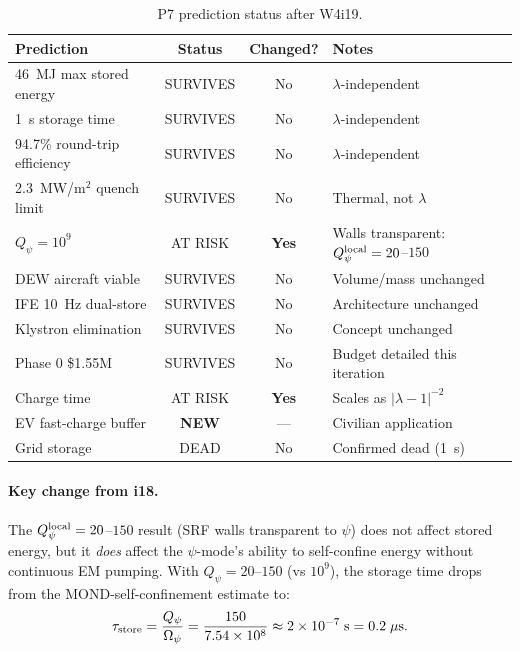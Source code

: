 \documentclass[11pt]{article}
\newcommand{\ee}[1]{\times 10^{#1}}
\newcommand{\lambdaone}{|\lambda-1|}
\newcommand{\Opsi}{\Omega_\psi}
\begin{document}
\begin{table}[h]
\centering
\caption{P7 prediction status after W4i19.}
\label{tab:status}
\begin{tabular}{@{}lccl@{}}
\toprule
\textbf{Prediction} & \textbf{Status} & \textbf{Changed?} & \textbf{Notes} \\
\midrule
46~MJ max stored energy & SURVIVES & No & $\lambda$-independent \\
1~s storage time & SURVIVES & No & $\lambda$-independent \\
94.7\% round-trip efficiency & SURVIVES & No & $\lambda$-independent \\
2.3~MW/m$^2$ quench limit & SURVIVES & No & Thermal, not $\lambda$ \\
$Q_\psi = 10^9$ & AT RISK & \textbf{Yes} & Walls transparent: $Q_\psi^{\rm local} = 20$--$150$ \\
DEW aircraft viable & SURVIVES & No & Volume/mass unchanged \\
IFE 10~Hz dual-store & SURVIVES & No & Architecture unchanged \\
Klystron elimination & SURVIVES & No & Concept unchanged \\
Phase 0 \$1.55M & SURVIVES & No & Budget detailed this iteration \\
Charge time & AT RISK & \textbf{Yes} & Scales as $\lambdaone^{-2}$ \\
EV fast-charge buffer & \textbf{NEW} & --- & Civilian application \\
Grid storage & DEAD & No & Confirmed dead (1~s) \\
\bottomrule
\end{tabular}
\end{table}

\paragraph{Key change from i18.}
The $Q_\psi^{\rm local} = 20$--$150$ result (SRF walls transparent to
$\psi$) does not affect stored energy, but it \emph{does} affect the
$\psi$-mode's ability to self-confine energy without continuous EM pumping.
With $Q_\psi = 20$--$150$ (vs $10^9$), the storage time drops from the
MOND-self-confinement estimate to:
\begin{equation}
\tau_{\rm store} = \frac{Q_\psi}{\Opsi}
= \frac{150}{7.54\ee{8}} \approx 2\ee{-7}\;\mathrm{s}
= 0.2\;\mu\mathrm{s}.
\end{equation}
\end{document}
